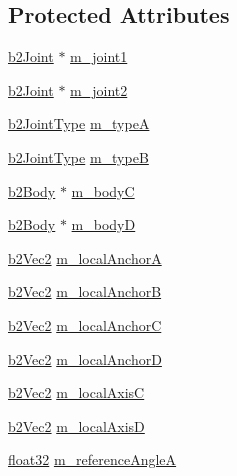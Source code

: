 \subsection*{Protected Attributes}
\begin{DoxyCompactItemize}
\item 
\mbox{\hyperlink{classb2_joint}{b2\+Joint}} $\ast$ \mbox{\hyperlink{classb2_gear_joint_a7694fc4574c774c22a8c202e0d49fd84}{m\+\_\+joint1}}
\item 
\mbox{\hyperlink{classb2_joint}{b2\+Joint}} $\ast$ \mbox{\hyperlink{classb2_gear_joint_a94290117dd4f2467eee49ecc150b9eb6}{m\+\_\+joint2}}
\item 
\mbox{\hyperlink{b2_joint_8h_a0bb202d8a286c888a11985b07b2272ab}{b2\+Joint\+Type}} \mbox{\hyperlink{classb2_gear_joint_a0819b72c766d69cb1995f6cca4e98853}{m\+\_\+typeA}}
\item 
\mbox{\hyperlink{b2_joint_8h_a0bb202d8a286c888a11985b07b2272ab}{b2\+Joint\+Type}} \mbox{\hyperlink{classb2_gear_joint_a03e1959e04a361db79ae5da5ba76379e}{m\+\_\+typeB}}
\item 
\mbox{\hyperlink{classb2_body}{b2\+Body}} $\ast$ \mbox{\hyperlink{classb2_gear_joint_a07e5f85b71bf335552835989dc013fe6}{m\+\_\+bodyC}}
\item 
\mbox{\hyperlink{classb2_body}{b2\+Body}} $\ast$ \mbox{\hyperlink{classb2_gear_joint_ad3a1795c11b652b4b2f8bfc3ed96cb0b}{m\+\_\+bodyD}}
\item 
\mbox{\hyperlink{structb2_vec2}{b2\+Vec2}} \mbox{\hyperlink{classb2_gear_joint_acac78f2e3730fda540d1c7a74889bfc5}{m\+\_\+local\+AnchorA}}
\item 
\mbox{\hyperlink{structb2_vec2}{b2\+Vec2}} \mbox{\hyperlink{classb2_gear_joint_a864c3d4d7944f72783a073993530d9fd}{m\+\_\+local\+AnchorB}}
\item 
\mbox{\hyperlink{structb2_vec2}{b2\+Vec2}} \mbox{\hyperlink{classb2_gear_joint_a9361797683a30e70afd5b8690fe47ba3}{m\+\_\+local\+AnchorC}}
\item 
\mbox{\hyperlink{structb2_vec2}{b2\+Vec2}} \mbox{\hyperlink{classb2_gear_joint_abdd5be52535b5b56e44fc27832d057d2}{m\+\_\+local\+AnchorD}}
\item 
\mbox{\hyperlink{structb2_vec2}{b2\+Vec2}} \mbox{\hyperlink{classb2_gear_joint_a52ae3b3a06ad9dae6b3201404784cc18}{m\+\_\+local\+AxisC}}
\item 
\mbox{\hyperlink{structb2_vec2}{b2\+Vec2}} \mbox{\hyperlink{classb2_gear_joint_a49cc9f1b74793dce3311cf7a35a8aee1}{m\+\_\+local\+AxisD}}
\item 
\mbox{\hyperlink{b2_settings_8h_aacdc525d6f7bddb3ae95d5c311bd06a1}{float32}} \mbox{\hyperlink{classb2_gear_joint_a1ba0c6172cd2dd2017813bab7d1b268b}{m\+\_\+reference\+AngleA}}

\end{DoxyCompactItemize}
